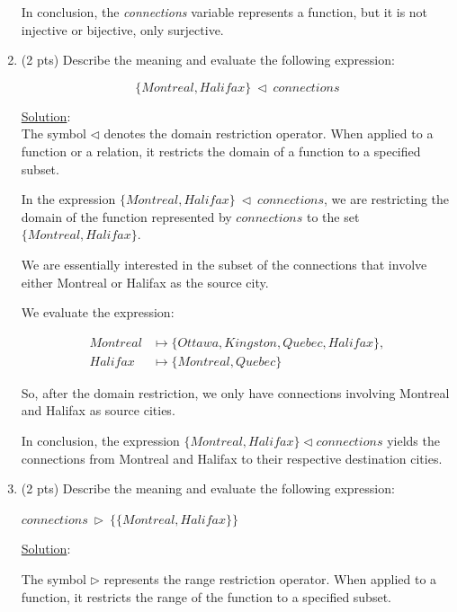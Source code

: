 \documentclass[12pt]{article}
\begin{document}
\begin{spacing}{1.5}
\begin{enumerate}
		      In conclusion, the \textit{connections} variable represents a function, but it is not injective or bijective, only surjective.
		      \newpage   
		\item (2 pts) Describe the meaning and evaluate the following expression:
		      
		      \indent $$\{Montreal, Halifax\} \: \triangleleft \: connections$$
		      
		      \noindent \underline{Solution}:\\
		      The symbol $\triangleleft$ denotes the domain restriction operator. When applied to a function or a relation, it restricts the domain of a function to a specified subset.
		      		      
		      In the expression $\{Montreal, Halifax\} \: \triangleleft \: connections$, we are restricting the domain of the function represented by $connections$ to the set $\{Montreal, Halifax\}$.
		      		      
		      We are essentially interested in the subset of the connections that involve either Montreal or Halifax as the source city.
		      		      
		      We evaluate the expression:
		      		          
		      \begin{align*}
		      	Montreal & \mapsto \{Ottawa, Kingston, Quebec, Halifax\}, \\
		      	Halifax  & \mapsto \{Montreal, Quebec\}                   
		      \end{align*}
		      		      
		      So, after the domain restriction, we only have connections involving Montreal and Halifax as source cities.
		      		      
		      In conclusion, the expression $\{Montreal, Halifax\} \triangleleft connections$ yields the connections from Montreal and Halifax to their respective destination cities.
		      		      
		\item (2 pts) Describe the meaning and evaluate the following expression:
		      		      
		      \indent $connections \: \triangleright \: \{\{Montreal, Halifax\}\}$
		      
		      \noindent \underline{Solution}:
		              
		      The symbol $\triangleright$ represents the range restriction operator. When applied to a function, it restricts the range of the function to a specified subset.
		      		      

\end{enumerate}
\end{spacing}
\end{document}
